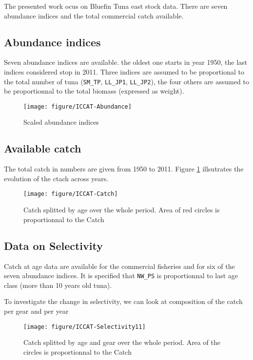 The presented  work ocus on  Bluefin Tuna  east stock data.  There are
seven abundance indices and the total commercial catch available. 





\subsection{Abundance indices}

Seven abundance indices are available.   the oldest one starts in year
1950,  the last  indices considered  stop in  2011. Three  indices are
assumed to be proportional to  the total number of tuna (\verb+SM_TP+,
\verb+LL_JP1+,  \verb+LL_JP2+),  the four  others  are  assumed to  be
proportionnal to the total biomass (expressed as weight).

\begin{figure}
{\centering \texttt{[image: figure/ICCAT-Abundance]} 
}
\caption{Scaled abundance indices }
\end{figure}




\subsection{Available catch}
The  total catch  in  numbers  are given  from  1950  to 2011.  Figure
\ref{fig:TotCatch} illsutrates the evolution of the ctach across years.
\begin{figure}
\centering \texttt{[image: figure/ICCAT-Catch]} 
\caption{Catch  splitted by  age over  the whole  period. Area  of red
  circles is proportionnal to the Catch}
\label{fig:TotCatch}
\end{figure}


\subsection{Data on Selectivity}
Catch at age  data are available for the commercial  fisheries and for
six of the seven abundance  indices. It is specified that \verb+NW_PS+
is proportionnal to last age class (more than 10 years old tuna).




To investigate the  change in selectivity, we can  look at composition
of the catch per gear and per year
\begin{figure}
{\centering \texttt{[image: figure/ICCAT-Selectivity11]} 
}
\caption{Catch splitted by age and gear over the whole period. Area of the
  circles is proportionnal to the Catch}
\end{figure}




